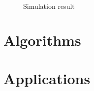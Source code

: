 \documentclass{../common/projectreport}
\begin{document}
\begin{figure}[tbh]
\caption{Simulation result}
\end{figure}






\section{Algorithms}


\section{Applications}





\newpage


\end{document}

